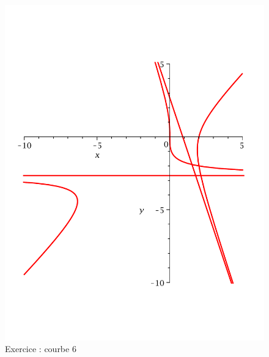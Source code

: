 \begin{figure}[ht]
   \centering
   \includegraphics[scale=0.25]{Ecr01_6.pdf}
   \caption{Exercice  : courbe 6}
\end{figure}
